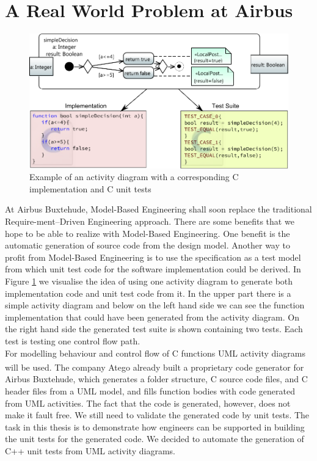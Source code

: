 \section{A Real World Problem at Airbus}
\begin{figure}
\label{fig:Act2Code+Tests}
\includegraphics[width=\textwidth]{./pics/Activity2Code+Test2.pdf}
\caption{Example of an activity diagram with a corresponding C implementation and C unit tests}
\end{figure}
At Airbus Buxtehude, Model-Based Engineering shall soon replace the traditional Require-ment--Driven Engineering approach. There are some benefits that we hope to be able to realize with Model-Based Engineering. One benefit is the automatic generation of source code from the design model. Another way to profit from Model-Based Engineering is to use the specification as a test model from which unit test code for the software implementation could be derived. In Figure \ref{fig:Act2Code+Tests} we visualise the idea of using one activity diagram to generate both implementation code and unit test code from it. In the upper part there is a simple activity diagram and below on the left hand side we can see the function implementation that could have been generated from the activity diagram. On the right hand side the generated test suite is shown containing two tests. Each test is testing one control flow path.\\
For modelling behaviour and control flow of C functions UML activity diagrams will be used. The company Atego\textsuperscript{\textregistered} already built a proprietary code generator for Airbus Buxtehude, which generates a folder structure, C source code files, and C header files from a UML model, and fills function bodies with code generated from UML activities. The fact that the code is generated, however, does not make it fault free. We still need to validate the generated code by unit tests. The task in this thesis is to demonstrate how engineers can be supported in building the unit tests for the generated code. We decided to automate the generation of C++ unit tests from UML activity diagrams.\\
